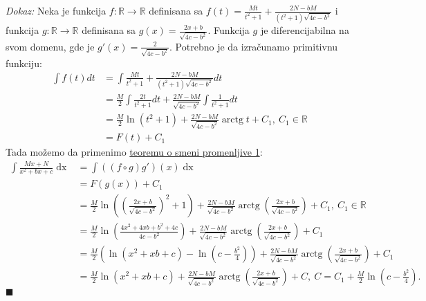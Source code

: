 \documentclass{article}
\DeclareMathOperator{\arctg}{arctg}
\DeclareMathOperator{\dx}{dx}
\begin{document}
\textit{Dokaz:} Neka je funkcija $ f:\mathbb{R}\longrightarrow\mathbb{R}$ definisana sa
$\displaystyle f\left(t\right)=\frac{Mt}{t^2+1}+\frac{2N-bM}{\left(t^2+1\right)\sqrt{4c-b^2}}$ i funkcija $g:\mathbb{R}\longrightarrow\mathbb{R}$
definisana sa $\displaystyle g\left(x\right)=\frac{2x+b}{\sqrt{4c-b^2}}$. Funkcija $g$ je diferencijabilna na svom domenu, gde je $\displaystyle g'\left(x\right)=\frac{2}{\sqrt{4c-b^2}}$.
Potrebno je da izračunamo primitivnu funkciju:
\begin{align*}
    \int f\left(t\right)dt & =\int \frac{Mt}{t^2+1}+\frac{2N-bM}{\left(t^2+1\right)\sqrt{4c-b^2}}dt                        \\
                           & =\frac{M}{2}\int \frac{2t}{t^2+1}dt+\frac{2N-bM}{\sqrt{4c-b^2}}\int\frac{1}{t^2+1}dt          \\
                           & =\frac{M}{2}\ln\left(t^2+1\right)+\frac{2N-bM}{\sqrt{4c-b^2}}\arctg{t}+C_1,\ C_1\in\mathbb{R} \\
                           & =F\left(t\right)+C_1
\end{align*}
Tada možemo da primenimo \hyperref[teorema_1.2]{teoremu o smeni promenljive 1}:
\begin{align*}
    \int \frac{Mx+N}{x^2+bx+c}\dx & = \int \left(\left(f\circ g\right) g'\right)\left(x\right)\dx                                                                                                               \\
                                  & = F\left(g\left(x\right)\right) + C_1                                                                                                                                       \\
                                  & = \frac{M}{2}\ln\left(\left(\frac{2x+b}{\sqrt{4c-b^2}}\right)^2+1\right)+\frac{2N-bM}{\sqrt{4c-b^2}}\arctg\left({\frac{2x+b}{\sqrt{4c-b^2}}}\right)+ C_1,\ C_1\in\mathbb{R} \\
                                  & = \frac{M}{2}\ln\left(\frac{4x^2+4xb+b^2+4c}{4c-b^2}\right)+\frac{2N-bM}{\sqrt{4c-b^2}}\arctg\left({\frac{2x+b}{\sqrt{4c-b^2}}}\right)+ C_1                                 \\
                                  & = \frac{M}{2}\left(\ln\left(x^2+xb+c\right)-\ln\left(c-\frac{b^2}{4}\right)\right)+\frac{2N-bM}{\sqrt{4c-b^2}}\arctg\left({\frac{2x+b}{\sqrt{4c-b^2}}}\right)+ C_1          \\
                                  & = \frac{M}{2}\ln\left(x^2+xb+c\right)+\frac{2N-bM}{\sqrt{4c-b^2}}\arctg\left({\frac{2x+b}{\sqrt{4c-b^2}}}\right)+ C,\ C=C_1+ \frac{M}{2}\ln\left(c-\frac{b^2}{4}\right).
\end{align*}
\null\hfill $\blacksquare$\par
\end{document}
